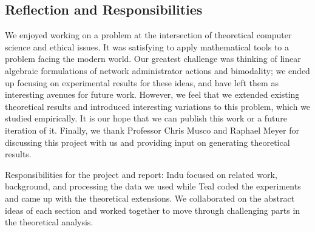 \subsection{Reflection and Responsibilities}
We enjoyed working on a problem at the intersection
of theoretical computer science and ethical issues.
It was satisfying to apply mathematical tools
to a problem facing the modern world.
Our greatest challenge was thinking of linear algebraic formulations of network administrator actions and bimodality; we ended up focusing on experimental results for these ideas, and have left them as interesting avenues for future work. 
However, we feel that we extended existing theoretical results
and introduced interesting variations to this problem, which we studied
empirically. 
It is our hope that we can publish this work or a future
iteration of it.
Finally, we thank Professor Chris Musco and Raphael Meyer for discussing this project with us and providing input on generating theoretical results. 


Responsibilities for the project and report:
Indu focused on related work, background, and processing
the data we used while
Teal coded the experiments and came up with the
theoretical extensions.
We collaborated on the abstract ideas of each section
and worked together to move through challenging parts
in the theoretical analysis.
